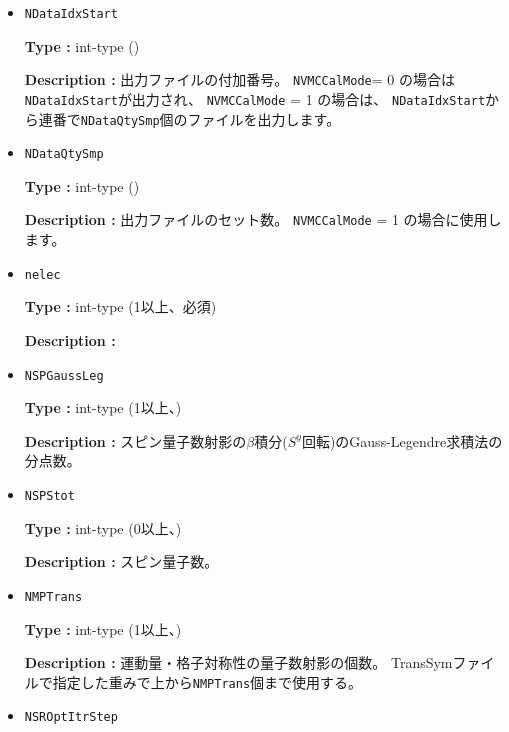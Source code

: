 \begin{itemize}
{\bf Description :} [0] 何もしない、[1] Single Lanczos Step でエネルギーまで計算、
[2] Single Lanczos Step で1 体・2 体のグリーン関数まで計算
(条件: 1, 2 は\verb|NVMCCalMode| = 1のみ使用可能. 
また, pair hopping項, exchange 項がハミルトニアンに含まれる場合は使用できません)。
 
 \item  \verb|NDataIdxStart|

 {\bf Type :} int-type ()

{\bf Description :} 出力ファイルの付加番号。
\verb|NVMCCalMode|= 0 の場合は\verb|NDataIdxStart|が出力され、 
\verb|NVMCCalMode| = 1 の場合は、
\verb|NDataIdxStart|から連番で\verb|NDataQtySmp|個のファイルを出力します。
   
 \item  \verb|NDataQtySmp|

 {\bf Type :} int-type ()

{\bf Description :} 出力ファイルのセット数。 \verb|NVMCCalMode| = 1 の場合に使用します。

\item  \verb|nelec|

  {\bf Type :} {int-type (1以上、必須)}

  {\bf Description :} 

\item  \verb|NSPGaussLeg|

  {\bf Type :} {int-type (1以上、)}

  {\bf Description :} スピン量子数射影の$\beta$積分($S^y$回転)のGauss-Legendre求積法の分点数。


\item  \verb|NSPStot|

  {\bf Type :} int-type (0以上、)

  {\bf Description :}  スピン量子数。

\item  \verb|NMPTrans|

  {\bf Type :} int-type (1以上、)

  {\bf Description :} 
  運動量・格子対称性の量子数射影の個数。
  TransSymファイルで指定した重みで上から\verb|NMPTrans|個まで使用する。

 \item  \verb|NSROptItrStep|


\end{itemize}
